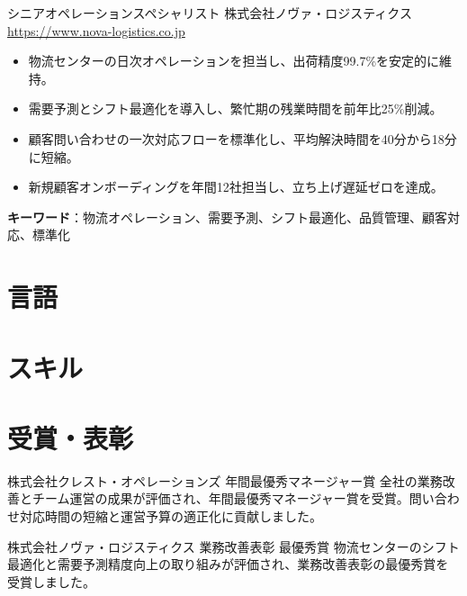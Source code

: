 \documentclass[a4paper, serif, 10pt]{moderncv}
\begin{document}
        {シニアオペレーションスペシャリスト}
        {株式会社ノヴァ・ロジスティクス}
        {\url{https://www.nova-logistics.co.jp}}
        {}
        {\begin{itemize}
\item 物流センターの日次オペレーションを担当し、出荷精度99.7\%を安定的に維持。
\item 需要予測とシフト最適化を導入し、繁忙期の残業時間を前年比25\%削減。
\item 顧客問い合わせの一次対応フローを標準化し、平均解決時間を40分から18分に短縮。
\item 新規顧客オンボーディングを年間12社担当し、立ち上げ遅延ゼロを達成。
\end{itemize}
\textbf{キーワード}：物流オペレーション、需要予測、シフト最適化、品質管理、顧客対応、標準化}
\section{言語}

\section{スキル}

\section{受賞・表彰}

        {株式会社クレスト・オペレーションズ}
        {年間最優秀マネージャー賞}
        {}
        {}
        {全社の業務改善とチーム運営の成果が評価され、年間最優秀マネージャー賞を受賞。問い合わせ対応時間の短縮と運営予算の適正化に貢献しました。}

        {株式会社ノヴァ・ロジスティクス}
        {業務改善表彰 最優秀賞}
        {}
        {}
        {物流センターのシフト最適化と需要予測精度向上の取り組みが評価され、業務改善表彰の最優秀賞を受賞しました。}
\end{document}
